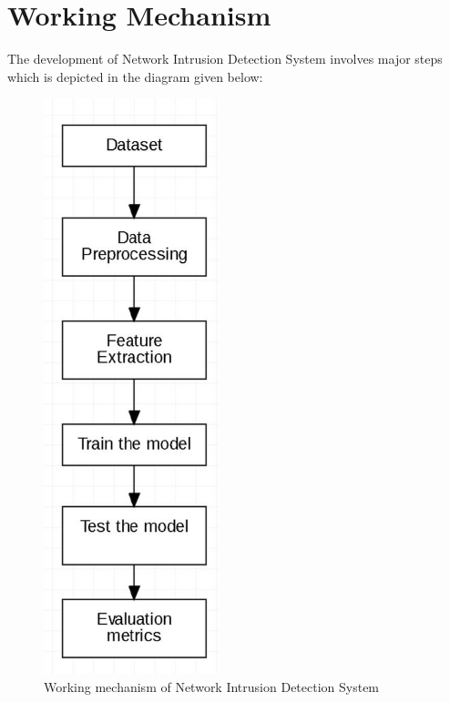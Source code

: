   \section{Working Mechanism}
  \vspace{-18pt}
The development of Network Intrusion Detection System involves major steps which is 
depicted in the diagram given below:
\begin{figure}[tbh] %
\begin{center}
	\includegraphics[width=2in]{images/ww1.jpg} 
	\caption{Working mechanism of Network Intrusion Detection System} %
	\label{Working mechanism of Network Intrusion Detection System} %
\end{center}
\end{figure}
\newpage
